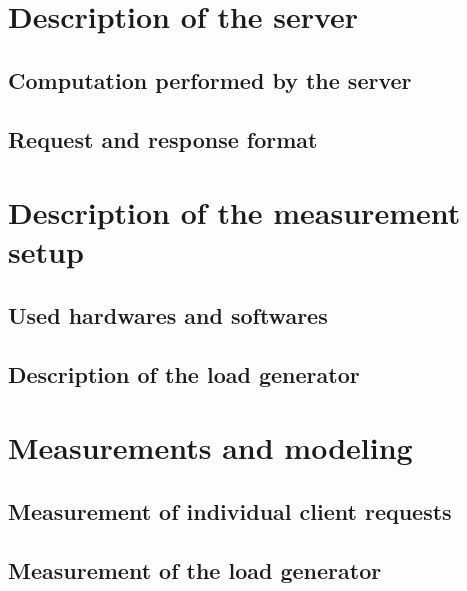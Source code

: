 \section{Description of the server}
\label{sec:Description of the server}

\subsection{Computation performed by the server}
\label{sub:Computation performed by the server}

\subsection{Request and response format}
\label{sub:Request and response format}

\section{Description of the measurement setup}
\label{sec:Description of the measurement setup}

\subsection{Used hardwares and softwares}
\label{sub:Used hardwares and softwares}

\subsection{Description of the load generator}
\label{sub:Description of the load generator}

\section{Measurements and modeling}
\label{sec:Measurements and modeling}

\subsection{Measurement of individual client requests}
\label{sub:Measurement of individual client requests}

\subsection{Measurement of the load generator}
\label{sub:Measurement of the load generator}

